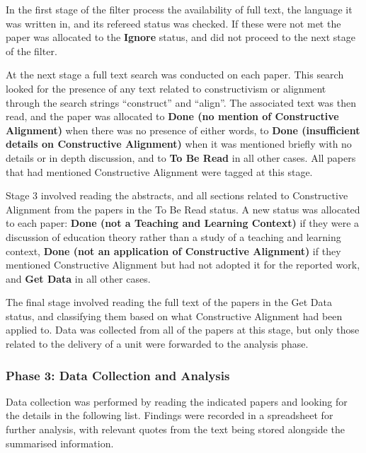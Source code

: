 In the first stage of the filter process the availability of full text, the language it was written in, and its refereed status was checked. If these were not met the paper was allocated to the \textbf{Ignore} status, and did not proceed to the next stage of the filter. 

At the next stage a full text search was conducted on each paper. This search looked for the presence of any text related to constructivism or alignment through the search strings ``construct'' and ``align''. The associated text was then read, and the paper was allocated to \textbf{Done (no mention of Constructive Alignment)} when there was no presence of either words, to \textbf{Done (insufficient details on Constructive Alignment)} when it was mentioned briefly with no details or in depth discussion, and to \textbf{To Be Read} in all other cases. All papers that had mentioned Constructive Alignment were tagged at this stage.

Stage 3 involved reading the abstracts, and all sections related to Constructive Alignment from the papers in the To Be Read status. A new status was allocated to each paper: \textbf{Done (not a Teaching and Learning Context)} if they were a discussion of education theory rather than a study of a teaching and learning context, \textbf{Done (not an application of Constructive Alignment)} if they mentioned Constructive Alignment but had not adopted it for the reported work, and \textbf{Get Data} in all other cases.

The final stage involved reading the full text of the papers in the Get Data status, and classifying them based on what Constructive Alignment had been applied to. Data was collected from all of the papers at this stage, but only those related to the delivery of a unit were forwarded to the analysis phase.


\subsubsection{Phase 3: Data Collection and Analysis} %
\label{ssub:data_collection_and_analysis}

Data collection was performed by reading the indicated papers and looking for the details in the following list. Findings were recorded in a spreadsheet for further analysis, with relevant quotes from the text being stored alongside the summarised information.

